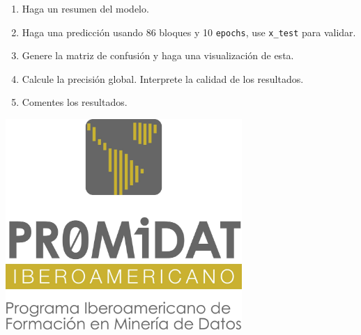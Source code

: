 \documentclass[spanish,12pt]{report}
\begin{document}
\begin{itemize}
\begin{enumerate}
\item Haga un resumen del modelo.

\item Haga una predicción usando 86 bloques y 10 {\tt epochs}, use {\tt x\_test} para validar.

\item Genere la matriz de confusión  y haga una visualización de esta.

\item Calcule la precisión global. Interprete
la calidad de los resultados.

\item Comentes los resultados.

\end{enumerate}



\begin{center}
\includegraphics[height=8cm]{Logo.jpg}
\end{center}

\end{itemize}
\end{document}
